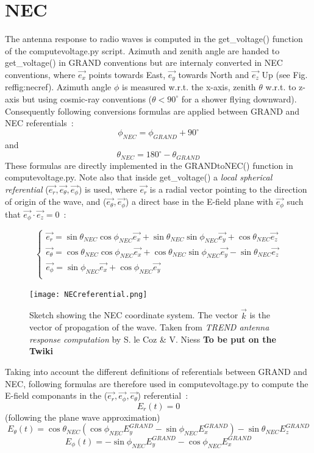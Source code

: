 \documentclass[12pt]{article}
\newcommand*{\courierfont}{\fontfamily{pcr}\selectfont}
\begin{document}
\section{NEC}\label{sec:nec}
The antenna response to radio waves is computed in the {\courierfont get\_voltage()} function of the {\courierfont computevoltage.py} script. Azimuth and zenith angle are handed to {\courierfont get\_voltage()} in GRAND conventions but are internaly converted in NEC conventions, where $\vec{e_x}$ points towards East, $\vec{e_y}$ towards North and $\vec{e_z}$ Up (see Fig. ref{fig:necref}). Azimuth angle $\phi$ is measured w.r.t. the x-axis, zenith $\theta$ w.r.t. to z-axis but using cosmic-ray conventions ($\theta<90^{\circ}$ for a shower flying downward). Consequently following conversions formulas are applied between GRAND and NEC referentials~:
\[\phi_{NEC}=\phi_{GRAND}+90^\circ\] and
\[\theta_{NEC}= 180^\circ-\theta_{GRAND}\] 
These formulas are directly implemented in the {\courierfont GRANDtoNEC()} function in {\courierfont computevoltage.py}.
Note also that inside {\courierfont get\_voltage()} a {\it local spherical referential} ($\vec{e_r},\vec{e_\theta},\vec{e_\phi}$) is used, where $\vec{e_r}$ is a radial vector pointing to the direction of origin of the wave, and ($\vec{e_\theta},\vec{e_\phi}$) a direct base in the E-field plane with $\vec{e_\phi}$ such that $\vec{e_\phi}\cdot\vec{e_z}=0$~:

\begin{equation}
  \left\{
      \begin{aligned}
        \vec{e_r} = \sin\theta_{NEC}\cos\phi_{NEC}\vec{e_x}+\sin\theta_{NEC}\sin\phi_{NEC}\vec{e_y}+\cos\theta_{NEC}\vec{e_z} \\
	\vec{e_\theta} = \cos\theta_{NEC}\cos\phi_{NEC}\vec{e_x}+\cos\theta_{NEC}\sin\phi_{NEC}\vec{e_y}-\sin\theta_{NEC}\vec{e_z} \\
	\vec{e_\phi} = \sin\phi_{NEC}\vec{e_x}+\cos\phi_{NEC}\vec{e_y} \\  
      \end{aligned}
    \right.
\end{equation}

\begin{figure}[ht]
\centering
\texttt{[image: NECreferential.png]} 
\caption{\label{fig:necref} Sketch showing the NEC coordinate system. The vector $\vec{k}$ is the vector of propagation of the wave. Taken from {\it TREND antenna response computation} by S. le Coz \& V. Niess {\bf To be put on the Twiki}}
\end{figure} 

Taking into account the different definitions of referentials between GRAND and NEC, following formulas are therefore used in {\courierfont computevoltage.py} to compute the E-field componants in the ($\vec{e_r},\vec{e_\phi},\vec{e_\theta}$) referential~: \\

\[E_r(t)=0 \] (following the plane wave approximation)
\[E_\theta(t) = \cos\theta_{NEC}(\cos\phi_{NEC} E_y^{GRAND} - \sin\phi_{NEC}E_x^{GRAND})-\sin\theta_{NEC}E_z^{GRAND} \] 
\[E_\phi(t) = -\sin\phi_{NEC}E_y^{GRAND}-\cos\phi_{NEC}E_x^{GRAND} \]
\end{document}
